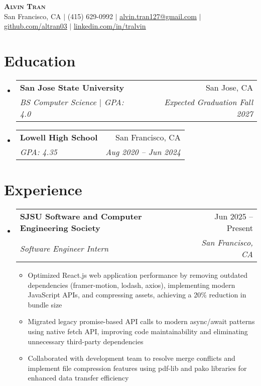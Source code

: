 \documentclass[letterpaper,11pt]{article}
\makeatletter
\newcommand{\resumeItem}[1]{
  \item\small{
    {#1 \vspace{-2pt}}
  }
}
\newcommand{\resumeSubheading}[4]{
  \vspace{-2pt}\item
    \begin{tabular*}{0.97\textwidth}[t]{l@{\extracolsep{\fill}}r}
      \textbf{#1} & #2 \\
      \textit{\small#3} & \textit{\small #4} \\
    \end{tabular*}\vspace{-7pt}
}
\newcommand{\resumeSubHeadingListStart}{\begin{itemize}[leftmargin=0.15in, label={}]}
\newcommand{\resumeSubHeadingListEnd}{\end{itemize}}
\newcommand{\resumeItemListStart}{\begin{itemize}}
\newcommand{\resumeItemListEnd}{\end{itemize}\vspace{-5pt}}
\makeatother
\begin{document}
\begin{center}
    \textbf{\Huge \scshape Alvin Tran} \\ \vspace{1pt}
    \small San Francisco, CA $|$ (415) 629-0992 $|$ \href{mailto:alvin.tran127@gmail.com}{\underline{alvin.tran127@gmail.com}} $|$ 
    \href{https://github.com/altran03}{\underline{github.com/altran03}} $|$
    \href{https://linkedin.com/in/tralvin}{\underline{linkedin.com/in/tralvin}}
\end{center}


\section{Education}
  \resumeSubHeadingListStart
    \resumeSubheading
      {San Jose State University}{San Jose, CA}
      {BS Computer Science $|$ GPA: 4.0}{Expected Graduation Fall 2027}
    \resumeSubheading
      {Lowell High School}{San Francisco, CA}
      {GPA: 4.35}{Aug 2020 -- Jun 2024}
  \resumeSubHeadingListEnd


\section{Experience}
  \resumeSubHeadingListStart

    \resumeSubheading
      {SJSU Software and Computer Engineering Society}{Jun 2025 -- Present}
      {Software Engineer Intern}{San Francisco, CA}
      \resumeItemListStart
        \resumeItem{Optimized React.js web application performance by removing outdated dependencies (framer-motion, lodash, axios), implementing modern JavaScript APIs, and compressing assets, achieving a 20\% reduction in bundle size}
        \resumeItem{Migrated legacy promise-based API calls to modern async/await patterns using native fetch API, improving code maintainability and eliminating unnecessary third-party dependencies}
        \resumeItem{Collaborated with development team to resolve merge conflicts and implement file compression features using pdf-lib and pako libraries for enhanced data transfer efficiency}
      \resumeItemListEnd

  \resumeSubHeadingListEnd


\end{document}
